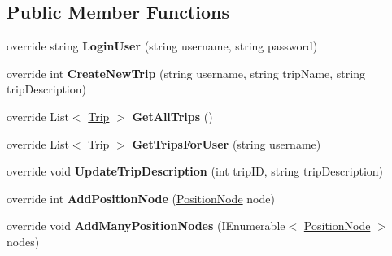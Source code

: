 \subsection*{Public Member Functions}
\begin{DoxyCompactItemize}
\item 
\hypertarget{class_tripi_w_c_f_1_1_service_1_1_trip_service_xml_a9ddf6e2d6e0f01aac8ff774b0acd2cf4}{
override string {\bfseries LoginUser} (string username, string password)}
\label{class_tripi_w_c_f_1_1_service_1_1_trip_service_xml_a9ddf6e2d6e0f01aac8ff774b0acd2cf4}

\item 
\hypertarget{class_tripi_w_c_f_1_1_service_1_1_trip_service_xml_a91e5871bbf09de872df92a747cf9d784}{
override int {\bfseries CreateNewTrip} (string username, string tripName, string tripDescription)}
\label{class_tripi_w_c_f_1_1_service_1_1_trip_service_xml_a91e5871bbf09de872df92a747cf9d784}

\item 
\hypertarget{class_tripi_w_c_f_1_1_service_1_1_trip_service_xml_a5c43d3882e9ccf203bfe81e9df32b24e}{
override List$<$ \hyperlink{class_tripi_w_c_f_1_1_service_1_1_trip}{Trip} $>$ {\bfseries GetAllTrips} ()}
\label{class_tripi_w_c_f_1_1_service_1_1_trip_service_xml_a5c43d3882e9ccf203bfe81e9df32b24e}

\item 
\hypertarget{class_tripi_w_c_f_1_1_service_1_1_trip_service_xml_a4f2eaff3c0493f62e73fad955f49c0da}{
override List$<$ \hyperlink{class_tripi_w_c_f_1_1_service_1_1_trip}{Trip} $>$ {\bfseries GetTripsForUser} (string username)}
\label{class_tripi_w_c_f_1_1_service_1_1_trip_service_xml_a4f2eaff3c0493f62e73fad955f49c0da}

\item 
\hypertarget{class_tripi_w_c_f_1_1_service_1_1_trip_service_xml_af47d308e4ec90adf657abb5da72f4c54}{
override void {\bfseries UpdateTripDescription} (int tripID, string tripDescription)}
\label{class_tripi_w_c_f_1_1_service_1_1_trip_service_xml_af47d308e4ec90adf657abb5da72f4c54}

\item 
\hypertarget{class_tripi_w_c_f_1_1_service_1_1_trip_service_xml_a9e7a51bab40f486016ff3c8af80169d1}{
override int {\bfseries AddPositionNode} (\hyperlink{class_tripi_w_c_f_1_1_service_1_1_position_node}{PositionNode} node)}
\label{class_tripi_w_c_f_1_1_service_1_1_trip_service_xml_a9e7a51bab40f486016ff3c8af80169d1}

\item 
\hypertarget{class_tripi_w_c_f_1_1_service_1_1_trip_service_xml_a91b1fa1c2a90ceb9dee50bd16afadc25}{
override void {\bfseries AddManyPositionNodes} (IEnumerable$<$ \hyperlink{class_tripi_w_c_f_1_1_service_1_1_position_node}{PositionNode} $>$ nodes)}
\label{class_tripi_w_c_f_1_1_service_1_1_trip_service_xml_a91b1fa1c2a90ceb9dee50bd16afadc25}


\end{DoxyCompactItemize}
